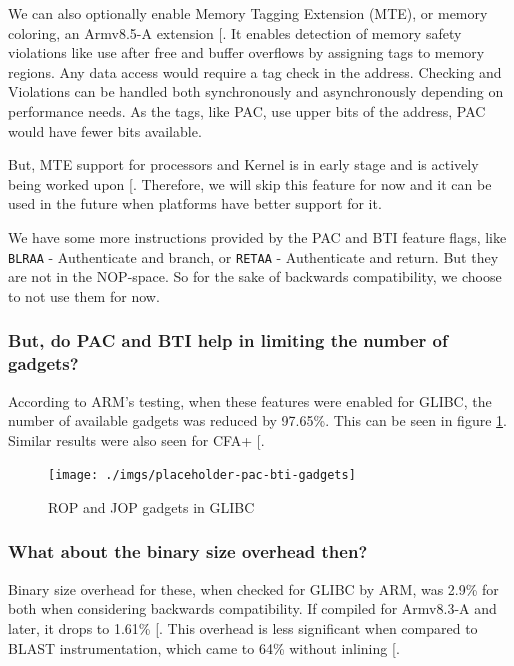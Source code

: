 \documentclass[a4paper, nobind]{templates/ociamthesis}
\begin{document}
We can also optionally enable Memory Tagging Extension (MTE), or memory coloring,
an Armv8.5-A extension {[}\citeproc{ref-arm-pacbti}{9}{]}. It enables detection of memory safety violations like use after free
and buffer overflows by assigning tags to memory regions. Any data access would
require a tag check in the address. Checking and Violations can be handled both
synchronously and asynchronously depending on performance needs.
As the tags, like PAC, use upper bits of the address, PAC would have fewer bits available.

But, MTE support for processors and Kernel is in early stage and is actively being worked upon {[}\citeproc{ref-mte-kern-patch}{57}{]}.
Therefore, we will skip this feature for now and it can be used in the future when platforms
have better support for it.

We have some more instructions provided by the PAC and BTI feature flags,
like \texttt{BLRAA} - Authenticate and branch, or \texttt{RETAA} - Authenticate and return.
But they are not in the NOP-space. So for the sake of backwards compatibility,
we choose to not use them for now.

\subsubsection{But, do PAC and BTI help in limiting the number of gadgets?}\label{but-do-pac-and-bti-help-in-limiting-the-number-of-gadgets}

According to ARM's testing, when these features were enabled for GLIBC, the number
of available gadgets was reduced by 97.65\%. This can be seen in figure \ref{fig:pac-bti-gadgets}.
Similar results were also seen for CFA+ {[}\citeproc{ref-cfaplus}{4}{]}.

\begin{figure}

{\centering \texttt{[image: ./imgs/placeholder-pac-bti-gadgets]} 

}

\caption{ROP and JOP gadgets in GLIBC}\label{fig:pac-bti-gadgets}
\end{figure}

\subsubsection{What about the binary size overhead then?}\label{what-about-the-binary-size-overhead-then}

Binary size overhead for these, when checked for GLIBC by ARM, was 2.9\% for both
when considering backwards compatibility. If compiled for Armv8.3-A and later,
it drops to 1.61\% {[}\citeproc{ref-arm-pacbti}{9}{]}.
This overhead is less significant when compared to BLAST instrumentation, which
came to 64\% without inlining {[}\citeproc{ref-blast}{56}{]}.
\end{document}
